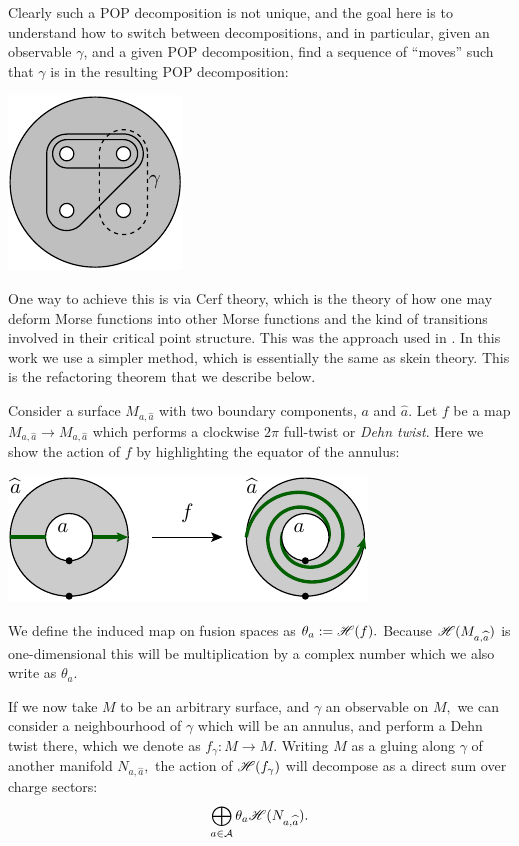 \documentclass[aps, prl, letterpaper, twocolumn, superscriptaddress, notitlepage, 10pt]{revtex4-1}
\begin{document}
Clearly such a POP decomposition is not unique,
and the goal here is to understand how to switch between decompositions,
and in particular, given an observable $\gamma$,
and a given POP decomposition, find a sequence
of ``moves'' such that $\gamma$ is in the resulting POP
decomposition:
\begin{center}
\includegraphics[]{pic-refactor.pdf}
\end{center}

One way to achieve this is via Cerf theory, which is the theory
of how one may deform Morse functions into other Morse functions
and the kind of transitions involved in their critical point structure.
This was the approach used in \cite{Freedman2002simulation}.
In this work we use a simpler method,
which is essentially the same as {skein theory.}
This is the {refactoring theorem} that we describe below.

Consider a surface $M_{a,\widehat{a}}$
with two boundary components, $a$ and $\widehat{a}.$
Let $f$ be a map $M_{a,\widehat{a}}\to M_{a,\widehat{a}}$
which performs a clockwise $2\pi$ full-twist or \emph{Dehn twist}.
Here we show the action of $f$ by highlighting the
equator of the annulus:
\begin{center}
\includegraphics[]{pic-dehn-twist.pdf}
\end{center}
We define the 
induced map on fusion spaces as $\theta_a := \mathscr{H}(f).$
Because $\mathscr{H}(M_{a,\widehat{a}})$ is one-dimensional
this will be multiplication by a complex number which we also
write as $\theta_a.$

If we now take $M$ to be an arbitrary surface, and $\gamma$ an
observable on $M,$ we can consider a neighbourhood of $\gamma$
which will be an annulus, and perform a Dehn twist there,
which we denote as $f_\gamma : M\to M.$
Writing $M$ as a gluing along $\gamma$ of another
manifold $N_{a,\widehat{a}},$
the action of $\mathscr{H}(f_\gamma)$ will decompose as a direct sum over charge 
sectors:
$$
\bigoplus_{a\in\mathcal{A}} \theta_a \mathscr{H}(N_{a,\widehat{a}}).
$$
\end{document}
